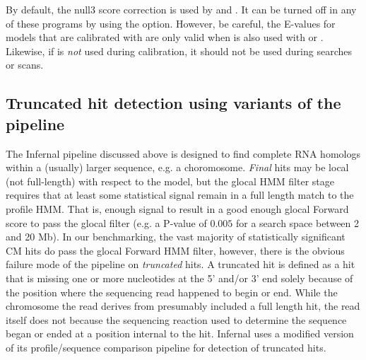 \begin{sreoutput}
%

By default, the null3 score correction is used by  and . It can be turned off in any of these
programs by using the  option. However, be careful,
the E-values for models that are calibrated with  are
only valid when  is also used with  or
. Likewise, if  is \emph{not} used during
calibration, it should not be used during searches or scans.

\subsection{Truncated hit detection using variants of the pipeline}

The Infernal pipeline discussed above is designed to find complete RNA
homologs within a (usually) larger sequence, e.g. a choromosome.
\emph{Final} hits may be local (not full-length) with respect to the
model, but the glocal HMM filter stage requires that at least some
statistical signal remain in a full length match to the profile
HMM. That is, enough signal to result in a good enough glocal Forward
score to pass the glocal filter (e.g. a P-value of $0.005$ for a
search space between 2 and 20 Mb). In our benchmarking, the vast
majority of statistically significant CM hits do pass the glocal
Forward HMM filter, however, there is the obvious failure mode of the
pipeline on \emph{truncated} hits. A truncated hit is defined as a hit
that is missing one or more nucleotides at the 5' and/or 3' end solely
because of the position where the sequencing read happened to begin or
end. While the chromosome the read derives from presumably included a
full length hit, the read itself does not because the sequencing
reaction used to determine the sequence began or ended at a position
internal to the hit. Infernal uses a modified version of its
profile/sequence comparison pipeline for detection of truncated hits.


\end{sreoutput}

